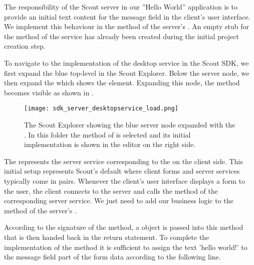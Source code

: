 %

The responsibility of the Scout server in our ''Hello World'' application is to provide an initial text content for the message field in the client's user interface.
We implement this behaviour in the  method of the server's .
An empty stub for the  method of the  service has already been created during the initial project creation step. 

To navigate to the implementation of the desktop service in the Scout SDK, we first expand the blue top-level  in the Scout Explorer.
Below the server node, we then expand the  which shows the  element.
Expanding this  node, the  method becomes visible as shown in .

\begin{figure}
\texttt{[image: sdk\_server\_desktopservice\_load.png]}
\caption{The Scout Explorer showing the blue server node expanded with the .
In this folder the  method of  is selected and its initial implementation is shown in the editor on the right side.}
\end{figure}

The  represents the server service corresponding to the  on the client side.
This initial setup represents Scout's default where client forms and server services typically come in pairs.
Whenever the client's user interface displays a form to the user, the client connects to the server and calls the  method of the corresponding server service.
We just need to add our business logic to the  method of the server's .

According to the signature of the  method, a  object is passed into this method that is then handed back in the return statement.
To complete the implementation of the  method it is sufficient to assign the text 'hello world!' to the message field part of the form data according to the following line.

